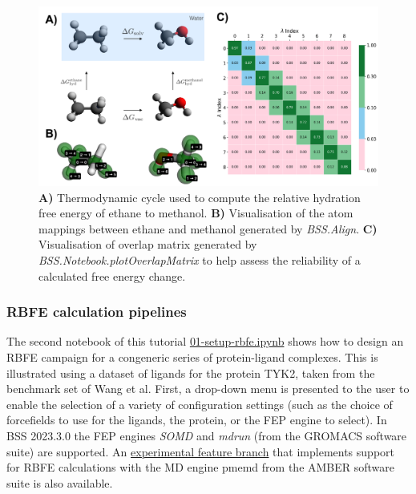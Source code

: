 \begin{figure}[htp]
\includegraphics[width=\linewidth]{LIVECOMS/04_fep/introfep_updated.png}
\caption{ \textbf{A)} Thermodynamic cycle used to compute the relative hydration free energy of ethane to methanol. \textbf{B)} Visualisation of the atom mappings between ethane and methanol generated by \emph{BSS.Align}. \textbf{C)} Visualisation of overlap matrix generated by \emph{BSS.Notebook.plotOverlapMatrix} to help assess the reliability of a calculated free energy change.}
\label{thermodynamic_cycle_fig}
\end{figure}


\subsubsection{RBFE calculation pipelines}

The second notebook of this tutorial \href{https://github.com/OpenBioSim/biosimspace_tutorials/blob/main/04_fep/02_RBFE/01_setup_rbfe.ipynb}{01-setup-rbfe.ipynb} shows how to design an RBFE campaign for a congeneric series of protein-ligand complexes. This is illustrated using a dataset of ligands for the protein TYK2, taken from the benchmark set of Wang et al. \cite{Wang2015} 
First, a drop-down menu is presented to the user to enable the selection of a variety of configuration settings (such as the choice of forcefields to use for the ligands, the protein, or the FEP engine to select). In BSS 2023.3.0 the FEP engines \emph{SOMD} and \emph{mdrun} (from the GROMACS software suite) are supported. An \href{https://github.com/michellab/BioSimSpace/tree/feature-amber-fep}{experimental feature branch} that implements support for RBFE calculations with the MD engine pmemd from the AMBER software suite is also available. 

